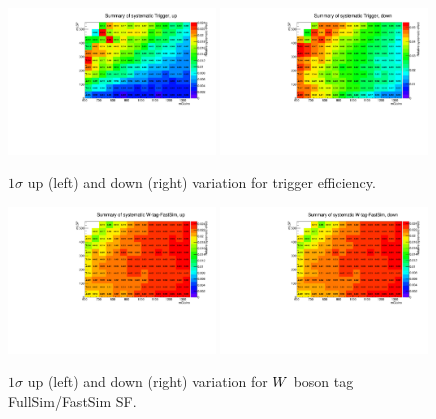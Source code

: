 \begin{figure}[htpb]
\includegraphics[width=0.49\textwidth]{figures/app_sig_syst/sys_Trigger_up}
\includegraphics[width=0.49\textwidth]{figures/app_sig_syst/sys_Trigger_down}
\caption{$1\sigma$ up (left) and down (right) variation for trigger efficiency.}
\end{figure}

\begin{figure}[htpb]
\includegraphics[width=0.49\textwidth]{figures/app_sig_syst/sys_W-tag-FastSim_up}
\includegraphics[width=0.49\textwidth]{figures/app_sig_syst/sys_W-tag-FastSim_down}
\caption{$1\sigma$ up (left) and down (right) variation for $W$ boson tag FullSim/FastSim SF.}
\end{figure}

